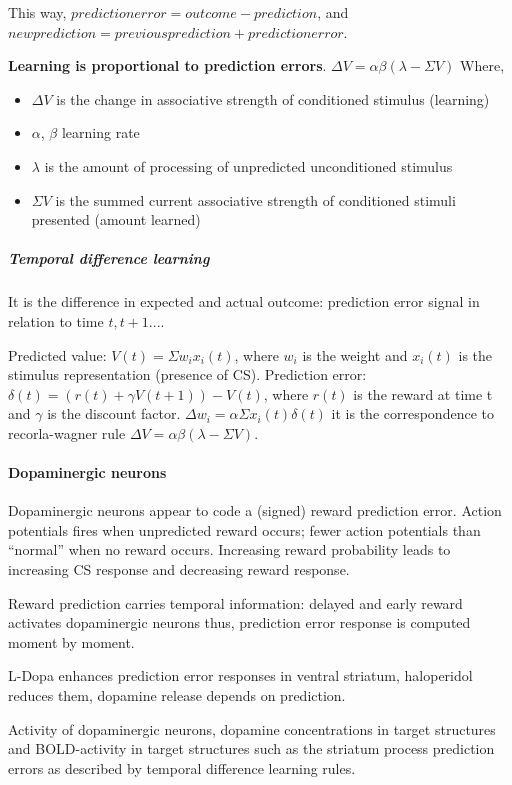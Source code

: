 \documentclass[12pt,article,oneside,a4paper]{memoir}
\begin{document}
This way, $prediction error = outcome - prediction$, and $new prediction = 
previous prediction + prediction error$.

\textbf{Learning is proportional to prediction errors}.
$\Delta V = \alpha \beta (\lambda - \Sigma V)$
Where, 
\begin{itemize}
\item $\Delta V$ is the change in associative strength of conditioned stimulus
(learning)
\item $\alpha$, $\beta$ learning rate
\item $\lambda$ is the amount of processing of unpredicted unconditioned
stimulus 
\item $\Sigma V$ is the summed current associative strength of conditioned
stimuli presented (amount learned)
\end{itemize}

\subparagraph{Temporal difference learning}
It is the difference in expected and actual outcome: prediction error signal in
relation to time $t, t+1...$.

Predicted value: $V(t) = \Sigma w_{i} x_{i}(t)$, where $w_{i}$ is the weight
and $x_{i}(t)$ is the stimulus representation (presence of CS).
Prediction error: $\delta(t) = (r(t) + \gamma V(t+1)) - V(t)$, where $r(t)$ is
the reward at time t and $\gamma$ is the discount factor.
$\Delta w_{i} = \alpha \Sigma x_{i}(t) \delta(t)$ it is the correspondence to
recorla-wagner rule $\Delta V = \alpha \beta (\lambda - \Sigma V)$.

\paragraph{Dopaminergic neurons} 
Dopaminergic neurons appear to code a (signed) reward prediction error. Action
potentials fires when unpredicted reward occurs; fewer action potentials than
``normal'' when no reward occurs. Increasing reward probability leads to
increasing CS response and decreasing reward response.

Reward prediction carries temporal information: delayed and early reward
activates dopaminergic neurons thus, prediction error response is computed
moment by moment.

L-Dopa enhances prediction error responses in ventral striatum, haloperidol
reduces them, dopamine release depends on prediction.

Activity of dopaminergic neurons, dopamine concentrations in target structures
and BOLD-activity in target structures such as the striatum process prediction
errors as described by temporal difference learning rules.
\end{document}
